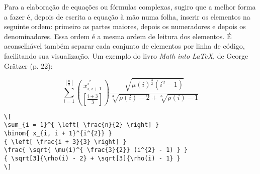 \documentclass{scrartcl}
\begin{document}
% 
% 
% 
% 



Para a elaboração de equações ou fórmulas complexas, sugiro que a melhor forma a fazer é, depois de escrita a equação à mão numa folha, inserir os elementos na seguinte ordem: primeiro as partes maiores, depois os numeradores e depois os denominadores. Essa ordem é a mesma ordem de leitura dos elementos. É aconselhável também separar cada conjunto de elementos por linha de código, facilitando sua visualização. Um exemplo do livro \textit{Math into \LaTeX}, de George Grätzer (p. 22):

\[
\sum_{i = 1}^{ \left[ \frac{n}{2} \right] }
\binom{ x_{i, i + 1}^{i^{2}} }
{ \left[ \frac{i + 3}{3} \right] }
\frac{ \sqrt{ \mu(i)^{ \frac{3}{2}} (i^{2} - 1) } }
{ \sqrt[3]{\rho(i) - 2} + \sqrt[3]{\rho(i) - 1} }
\]


\begin{verbatim}
\[
\sum_{i = 1}^{ \left[ \frac{n}{2} \right] }
\binom{ x_{i, i + 1}^{i^{2}} }
{ \left[ \frac{i + 3}{3} \right] }
\frac{ \sqrt{ \mu(i)^{ \frac{3}{2}} (i^{2} - 1) } }
{ \sqrt[3]{\rho(i) - 2} + \sqrt[3]{\rho(i) - 1} }
\]
\end{verbatim}



\printindex

 
\end{document}
